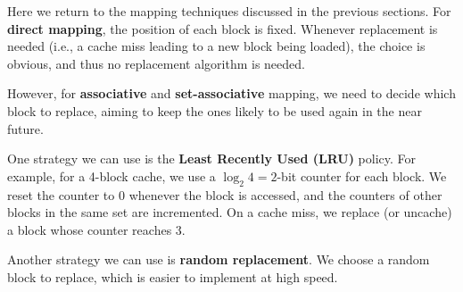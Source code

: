 Here we return to the mapping techniques discussed in the previous sections. For \textbf{direct mapping}, the position of each block is fixed. Whenever replacement is needed (i.e., a cache miss leading to a new block being loaded), the choice is obvious, and thus no replacement algorithm is needed.

However, for \textbf{associative} and \textbf{set-associative} mapping, we need to decide which block to replace, aiming to keep the ones likely to be used again in the near future.

One strategy we can use is the \textbf{Least Recently Used (LRU)} policy. For example, for a 4-block cache, we use a \(\log_2 4 = 2\)-bit counter for each block. We reset the counter to 0 whenever the block is accessed, and the counters of other blocks in the same set are incremented. On a cache miss, we replace (or uncache) a block whose counter reaches 3.

Another strategy we can use is \textbf{random replacement}. We choose a random block to replace, which is easier to implement at high speed.